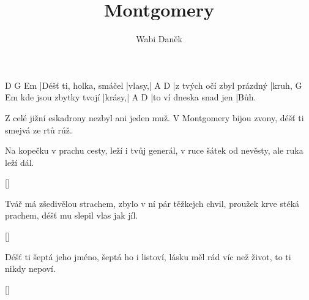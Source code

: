 \documentclass{song}
\title{Montgomery}
\author{Wabi Daněk}
\begin{document}
\strophe
D                       G      Em
|Déšť ti, holka, smáčel |vlasy,|
A\7                       D
|z tvých očí zbyl prázdný |kruh,
                      G      Em
kde jsou zbytky tvojí |krásy,|
A\7                    D
|to ví dneska snad jen |Bůh.
\endstrophe

Z celé jižní eskadrony
nezbyl ani jeden muž.
V Montgomery bijou zvony,
déšť ti smejvá ze rtů rúž.
\endstrophe

\strophe
Na kopečku v prachu cesty,
leží i tvůj generál,
v ruce šátek od nevěsty,
ale ruka leží dál.
\endstrophe

\ref{}

\strophe*
Tvář má zšedivělou strachem,
zbylo v ní pár těžkejch chvil,
proužek krve stéká prachem,
déšť mu slepil vlas jak jíl.
\endstrophe

\ref{}

\strophe*
Déšť ti šeptá jeho jméno,
šeptá ho i listoví,
lásku měl rád víc než život,
to ti nikdy nepoví.
\endstrophe

\ref{}
\end{document}
